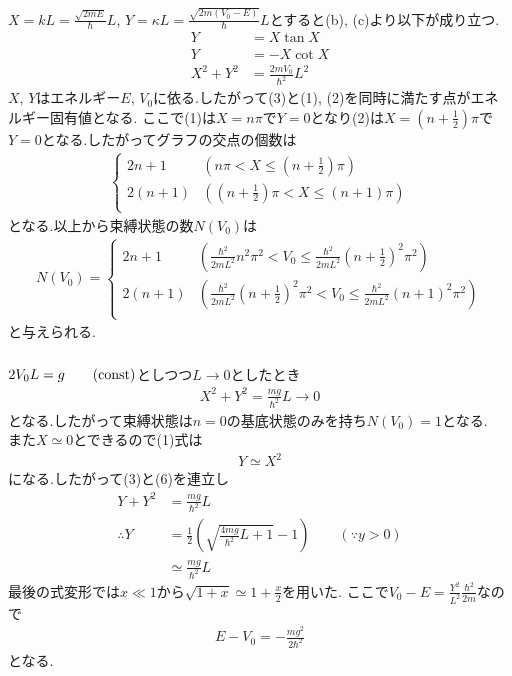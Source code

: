 \subsubsection{}
$X=kL=\frac{\sqrt{2mE}}{\hbar}L$, $Y=\kappa L=\frac{\sqrt{2m(V_0-E)}}{\hbar}L$とすると(b), (c)より以下が成り立つ.
\begin{align}
  Y&=X\tan X\\
  Y&=-X\cot X\\
  X^2+Y^2&=\frac{2mV_0}{\hbar^2}L^2
\end{align}
$X$, $Y$はエネルギー$E$, $V_0$に依る.したがって(3)と(1), (2)を同時に満たす点がエネルギー固有値となる.
ここで(1)は$X=n\pi$で$Y=0$となり(2)は$X=(n+\frac{1}{2})\pi$で$Y=0$となる.したがってグラフの交点の個数は
\begin{align}
  \begin{cases}
    2n+1&\left(n\pi<X\leq(n+\frac{1}{2})\pi\right)\\
    2(n+1)&\left((n+\frac{1}{2})\pi<X\leq(n+1)\pi\right)\\
  \end{cases}
\end{align}
となる.以上から束縛状態の数$N(V_0)$は
\begin{align*}
  N(V_0)=
  \begin{cases}
    2n+1&\left(\frac{\hbar^2}{2mL^2}n^2\pi^2<V_0\leq\frac{\hbar^2}{2mL^2}(n+\frac{1}{2})^2\pi^2\right)\\
    2(n+1)&\left(\frac{\hbar^2}{2mL^2}(n+\frac{1}{2})^2\pi^2<V_0\leq\frac{\hbar^2}{2mL^2}(n+1)^2\pi^2\right)\\
  \end{cases}
\end{align*}
と与えられる.
\newpage
\subsubsection{}
$2V_0L=g\qquad ({\rm const})$としつつ$L\rightarrow0$としたとき
\begin{align}
  X^2+Y^2=\frac{mg}{\hbar^2}L\rightarrow0
\end{align}
となる.したがって束縛状態は$n=0$の基底状態のみを持ち$N(V_0)=1$となる.\\
また$X\simeq0$とできるので(1)式は
\begin{align}
  Y\simeq X^2
\end{align}
になる.したがって(3)と(6)を連立し
\begin{align}
  Y+Y^2&=\frac{mg}{\hbar^2}L\nonumber\\
  \therefore Y&=\frac{1}{2}\left(\sqrt{\frac{4mg}{\hbar^2}L+1}-1\right)\qquad(\because y>0)\\
  &\simeq\frac{mg}{\hbar^2}L
\end{align}
最後の式変形では$x\ll1$から$\sqrt{1+x}\simeq1+\frac{x}{2}$を用いた.
ここで$V_0-E=\frac{Y^2}{L^2}\frac{\hbar^2}{2m}$なので
\begin{align*}
  E-V_0=-\frac{mg^2}{2\hbar^2}
\end{align*}
となる.